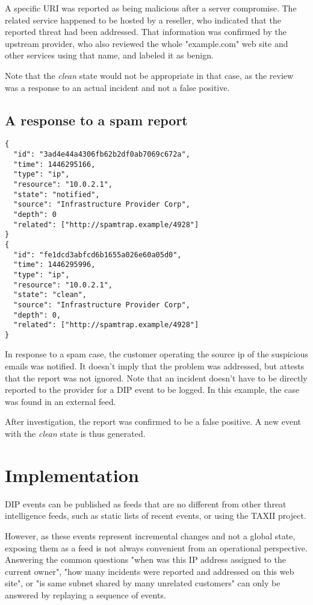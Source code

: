 \documentclass[conference]{IEEEtran}
\begin{document}
A specific URI was reported as being malicious after a server compromise. The related service happened to be hosted by a reseller, who indicated that the reported threat had been addressed. That information was confirmed by the upstream provider, who also reviewed the whole "example.com" web site and other services using that name, and labeled it as benign.

Note that the \emph{clean} state would not be appropriate in that case, as the review was a response to an actual incident and not a false positive.

\subsection{A response to a spam report}

\begin{verbatim}
{
  "id": "3ad4e44a4306fb62b2df0ab7069c672a",
  "time": 1446295166,
  "type": "ip",
  "resource": "10.0.2.1",
  "state": "notified",
  "source": "Infrastructure Provider Corp",
  "depth": 0
  "related": ["http://spamtrap.example/4928"]
}
{
  "id": "fe1dcd3abfcd6b1655a026e60a05d0",
  "time": 1446295996,
  "type": "ip",
  "resource": "10.0.2.1",
  "state": "clean",
  "source": "Infrastructure Provider Corp",
  "depth": 0,
  "related": ["http://spamtrap.example/4928"]
}	
\end{verbatim}

In response to a spam case, the customer operating the source ip of the suspicious emails was notified. It doesn't imply that the problem was addressed, but attests that the report was not ignored. Note that an incident doesn't have to be directly reported to the provider for a DIP event to be logged. In this example, the case was found in an external feed.

After investigation, the report was confirmed to be a false positive. A new event with the \emph{clean} state is thus generated.

\section{Implementation}

DIP events can be published as feeds that are no different from other threat intelligence feeds, such as static lists of recent events, or using the TAXII project.

However, as these events represent incremental changes and not a global state, exposing them as a feed is not always convenient from an operational perspective. Answering the common questions "when was this IP address assigned to the current owner", "how many incidents were reported and addressed on this web site", or "is same subnet shared by many unrelated customers" can only be answered by replaying a sequence of events.
\end{document}
